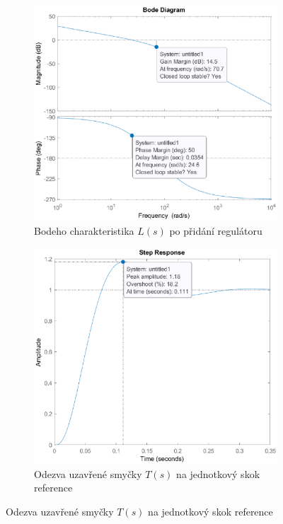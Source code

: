 \documentclass[twoside]{article}
\begin{document}
\begin{figure}[htbp]
    \centering %
\begin{subfigure}{0.48\textwidth}
  \includegraphics[width=\linewidth]{bode_novy.eps}
  \caption{Bodeho charakteristika $L(s)$ po přidání regulátoru}
  \label{fig:bode_regulator}
\end{subfigure}\hfil %
\begin{subfigure}{0.48\textwidth}
	\includegraphics[width=\linewidth]{step_response.eps}
	\caption{Odezva uzavřené smyčky $T(s)$ na jednotkový skok reference}
	\label{fig:step_response}
\end{subfigure}
\end{figure}
\end{document}

